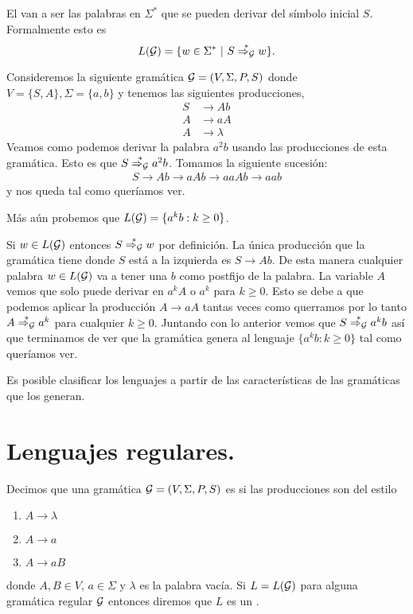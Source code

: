 \documentclass[tesis.tex]{subfiles}
\newcommand{\gramatica}{{\cal G} = (V, \Sigma, P, S)}
\newcommand{\deriva}{\overset{*}{\Rightarrow_{\cal G}}}
\newcommand{\lengderivado}{L({\cal G})}
\begin{document}
\medskip
\begin{deff}
	El  van a ser las palabras en $\Sigma^*$ que se pueden derivar del símbolo inicial $S$. Formalmente esto es
	\[
	L({\cal G}) = \{ w \in \Sigma^* \ | \ S \overset{*}{\Rightarrow_{\cal G}} w   \}.
	\]
\end{deff}
\medskip
\begin{ej}\label{gramatica-regular}
	Consideremos la siguiente gramática ${\cal G} = (V, \Sigma, P, S)$ donde $V = \{ S, A \}, \Sigma = \{ a,b \}$ y tenemos las siguientes producciones,
	\begin{align*}
	S & \to Ab \\
	A & \to aA \\
	A & \to \lambda
	\end{align*}
	Veamos como podemos derivar la palabra $a^2b$ usando las producciones de esta gramática. 
	Esto es que $S \deriva a^2b$.
	Tomamos la siguiente sucesión:
	\begin{align*}
		S \to Ab \to aAb \to aaAb \to aab
	\end{align*} 
	y nos queda tal como queríamos ver.
	
	Más aún probemos que $L({\cal G}) = \{ a^kb : k \ge 0 \}$. 
	
	Si $w \in L(\cal G)$ entonces $S \deriva w$ por definición. 
	La única producción que la gramática tiene donde $S$ está a la izquierda es $S \to Ab$. 
	De esta manera cualquier palabra $w \in L(\cal G)$ va a tener una $b$ como postfijo de la palabra. 
	La variable $A$ vemos que solo puede derivar en $a^kA$ o $a^k$ para $k \ge 0$.
	Esto se debe a que podemos aplicar la producción $A \to aA$ tantas veces como querramos por lo tanto $A \deriva a^k$ para cualquier $k \ge 0$.
	Juntando con lo anterior vemos que $S \deriva a^kb$ así que terminamos de ver que la gramática genera al lenguaje $\{a^kb : k \ge 0\}$ tal como queríamos ver.
\end{ej}



Es posible clasificar los lenguajes a partir de las características de las gramáticas que los generan. 

\section{Lenguajes regulares.}

\begin{deff}
	Decimos que una gramática $\gramatica$ es  si las producciones son del estilo
	\begin{enumerate}
		\item $A \to \lambda$
		\item $A \to a$
		\item $A \to a B$
	\end{enumerate}
	donde $A, B \in V$, $a \in \Sigma$ y $\lambda$ es la palabra vacía. 
	Si $L=\lengderivado$ para alguna gramática regular $\cal G$ entonces diremos que $L$ es un . 
\end{deff}
\end{document}
